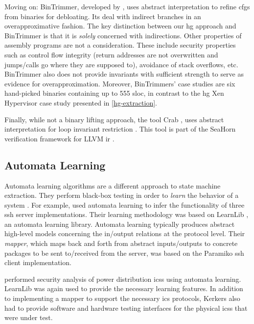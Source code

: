 Moving on: BinTrimmer, developed by \textcite{redini2019b}, uses abstract interpretation to refine \acp{cfg} from binaries for debloating.
Its deal with indirect branches in an overapproximative fashion.
The key distinction between our \ac{hg} approach and BinTrimmer is that it is \emph{solely} concerned with indirections.
Other properties of assembly programs are not a consideration.
These include security properties such as control flow integrity (return addresses are not overwritten and jumps/calls go where they are supposed to), avoidance of stack overflows, etc.
BinTrimmer also does not provide invariants with sufficient strength to serve as evidence for overapproximation.
Moreover, BinTrimmers' case studies are six hand-picked binaries containing up to \num{555} \ac{sloc}, in contrast to the \ac{hg} Xen Hypervisor case study presented in \cref{hg-extraction}.

Finally, while not a binary lifting approach, the tool Crab \autocite{crab}, uses abstract interpretation for loop invariant restriction \autocite{gange2016abstract}.
This tool is part of the SeaHorn verification framework for LLVM \ac{ir} \autocite{seahorn}.

\subsection{Automata Learning}\label{related-automata}
Automata learning algorithms are a different approach to state machine extraction.
They perform black-box testing in order to \emph{learn} the behavior of a system \autocite{steffen2011active}.
For example, \textcite{fiter2017ssh} used automata learning to infer the functionality of three \ac{ssh} server implementations.
Their learning methodology was based on LearnLib \autocite{raffelt2005learnlib}, an automata learning library.
Automata learning typically produces abstract high-level models concerning the in/output relations at the protocol level.
Their \emph{mapper}, which maps back and forth from abstract inputs/outputs to concrete packages to be sent to/received from the server,
was based on the Paramiko
\ac{ssh} client implementation.

\Textcite{kerkers2017assessing} performed security analysis
of power distribution \acp{ics} using automata learning.
LearnLib was again used to provide the necessary learning features.
In addition to implementing a mapper to support the necessary \ac{ics}
protocols, Kerkers also had to provide software and hardware testing interfaces for the physical \acp{ics} that were under test.

